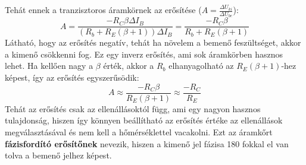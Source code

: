 \documentclass[../main.tex]{subfiles}
\begin{document}
Tehát ennek a tranzisztoros áramkörnek az erősítése ($A = \frac{\Delta U_{ki}}{\Delta U_{be}}$):
\begin{equation}
    A = \frac{- R_C \beta \Delta I_B}{(R_b + R_E (\beta + 1)) \Delta I_B} = \boxed{\frac{- R_C \beta}{R_b + R_E (\beta + 1)}}
\end{equation}
Látható, hogy az erősítés negatív, tehát ha növelem a bemenő feszültséget, akkor a kimenő csökkenni fog. Ez egy inverz erősítés, ami sok áramkörben hasznos lehet.
Ha kellően nagy a $\beta$ érték, akkor a $R_b$ elhanyagolható az $R_E (\beta + 1)$-hez képest, így az erősítés egyszerűsödik:
\begin{equation}
    A \approx \frac{- R_C \beta}{R_E (\beta + 1)} \approx \frac{- R_C}{R_E}
\end{equation}
Tehát az erősítés csak az ellenállásoktól függ, ami egy nagyon hasznos tulajdonság, hiszen így könnyen beállítható az erősítés értéke az ellenállások megválasztásával és nem kell a hőmérséklettel vacakolni.
Ezt az áramkőrt \textbf{fázisfordító erősítőnek} nevezik, hiszen a kimenő jel fázisa 180 fokkal el van tolva a bemenő jelhez képest.
\end{document}
